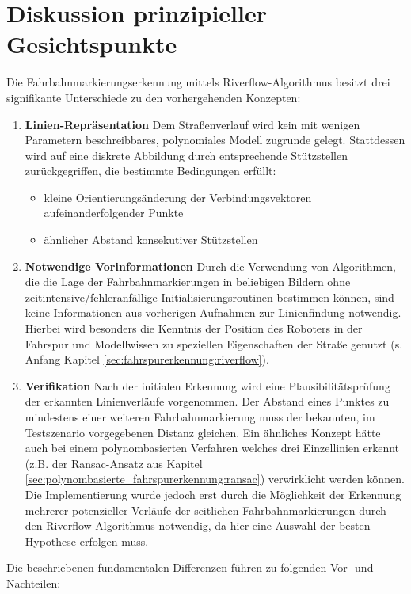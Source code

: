 \section{Diskussion prinzipieller Gesichtspunkte \dcsecondauthorshort} 
\label{sec:evaluation:riverflow:diskussion_prinzip}
Die Fahrbahnmarkierungserkennung mittels Riverflow-Algorithmus besitzt drei signifikante Unterschiede zu den vorhergehenden Konzepten:
\begin{enumerate}
\item \label{item:evaluation:riverflow:no_model}
\textbf{Linien-Repräsentation} Dem Straßenverlauf wird kein mit wenigen Parametern beschreibbares, polynomiales Modell zugrunde gelegt. Stattdessen wird auf eine diskrete Abbildung durch entsprechende Stützstellen zurückgegriffen, die bestimmte Bedingungen erfüllt:
\begin{itemize}
\item kleine Orientierungsänderung der Verbindungsvektoren aufeinanderfolgender Punkte
\item ähnlicher Abstand konsekutiver Stützstellen
\end{itemize}
\item \label{item:evaluation:riverflow:no_old_points_needed}
\textbf{Notwendige Vorinformationen} Durch die Verwendung von Algorithmen, die die Lage der Fahrbahnmarkierungen in beliebigen Bildern ohne zeitintensive/fehleranfällige Initialisierungsroutinen bestimmen können, sind keine Informationen aus vorherigen Aufnahmen zur Linienfindung notwendig. Hierbei wird besonders die Kenntnis der Position des Roboters in der Fahrspur und Modellwissen zu speziellen Eigenschaften der Straße genutzt (s. Anfang Kapitel \ref{sec:fahrspurerkennung:riverflow}).
\item \label{item:evaluation:riverflow:verification}
\textbf{Verifikation} Nach der initialen Erkennung wird eine Plausibilitätsprüfung der erkannten Linienverläufe vorgenommen. Der Abstand eines Punktes zu mindestens einer weiteren Fahrbahnmarkierung muss der bekannten, im Testszenario vorgegebenen Distanz gleichen. Ein ähnliches Konzept hätte auch bei einem polynombasierten Verfahren welches drei Einzellinien erkennt (z.B. der Ransac-Ansatz aus Kapitel \ref{sec:polynombasierte_fahrspurerkennung:ransac}) verwirklicht werden können. Die Implementierung wurde jedoch erst durch die Möglichkeit der Erkennung mehrerer potenzieller Verläufe der seitlichen Fahrbahnmarkierungen durch den Riverflow-Algorithmus notwendig, da hier eine Auswahl der besten Hypothese erfolgen muss.
\end{enumerate}
Die beschriebenen fundamentalen Differenzen führen zu folgenden Vor- und Nachteilen:

